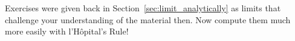 {\noindent Exercises}
{ were given back in Section~\ref{sec:limit_analytically} as limits that challenge your understanding of the material then.  Now compute them much more easily with l'H\^{o}pital's Rule!}
